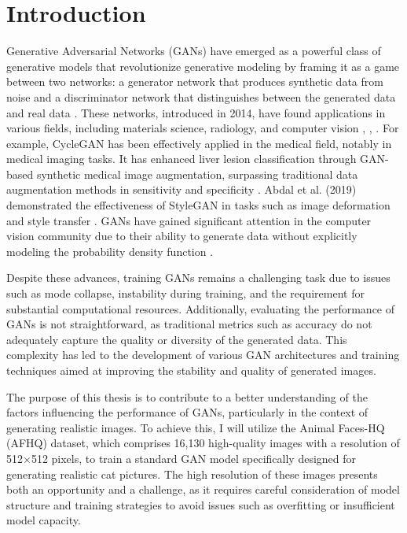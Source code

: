 \chapter{Introduction}


Generative Adversarial Networks (GANs) have emerged as a powerful class of generative models that revolutionize 
generative modeling by framing it as a game between two networks: a generator network that produces synthetic data 
from noise and a discriminator network that distinguishes between the generated data and real data \citep{10.48550/arxiv.1704.00028}. 
These networks, introduced in 2014, have found applications in various fields, including materials science, 
radiology, and computer vision \citep{10.1002/mgea.30}, \citep{10.1016/j.media.2019.101552}, \citep{10.1016/j.artmed.2020.101938}. 
For example, CycleGAN has been effectively applied in the medical field, notably in medical imaging tasks. 
It has enhanced liver lesion classification through GAN-based synthetic medical image augmentation, surpassing traditional data 
augmentation methods in sensitivity and specificity \citep{10.1016/j.neucom.2018.09.013}. 
Abdal et al. (2019) demonstrated the effectiveness of StyleGAN in tasks such as image deformation and style transfer \citep{10.1109/iccv.2019.00453}. 
GANs have gained significant attention in the computer vision community due to their ability to generate data without explicitly 
modeling the probability density function \citep{10.1016/j.media.2019.101552}.

Despite these advances, training GANs remains a challenging task due to issues such as mode collapse, instability during training, 
and the requirement for substantial computational resources. Additionally, evaluating the performance of GANs is not straightforward, 
as traditional metrics such as accuracy do not adequately capture the quality or diversity of the generated data. This complexity has 
led to the development of various GAN architectures and training techniques aimed at improving the stability and quality of generated images.

The purpose of this thesis is to contribute to a better understanding of the factors influencing the performance of GANs, 
particularly in the context of generating realistic images. To achieve this, I will utilize the Animal Faces-HQ (AFHQ) dataset, 
which comprises 16,130 high-quality images with a resolution of 512×512 pixels, to train a standard GAN model specifically designed 
for generating realistic cat pictures. The high resolution of these images presents both an opportunity and a challenge, as it requires 
careful consideration of model structure and training strategies to avoid issues such as overfitting or insufficient model capacity.

